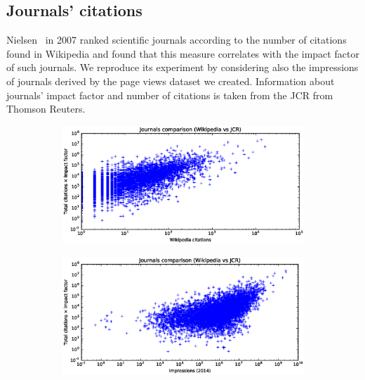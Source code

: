 \subsection{Journals' citations}
Nielsen~\cite{Nielsen2007} in 2007 ranked scientific journals according to the number of citations found in Wikipedia and found that this measure correlates with the impact factor of such journals.
We reproduce its experiment by considering also the impressions of journals derived by the page views dataset we created.
Information about journals' impact factor and number of citations is taken from the \ac{JCR} from Thomson Reuters.

\begin{figure}[h]
    \centering
    \begin{subfigure}{1\textwidth}
        \centering
        \includegraphics[keepaspectratio=true, width=\textwidth]{assets/journals_compare_appearances}
\label{fig:journals_compare_appearances}
    \end{subfigure}
    \begin{subfigure}{1\textwidth}
        \centering
        \includegraphics[keepaspectratio=true, width=\textwidth]{assets/journals_compare_impressions2014}

\end{subfigure}
\end{figure}
